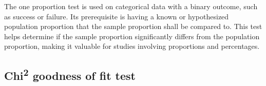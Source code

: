 \documentclass[
  a4paper,
]{scrbook}
\begin{document}
The one proportion test is used on categorical data with a binary
outcome, such as success or failure. Its prerequisite is having a known
or hypothesized population proportion that the sample proportion shall
be compared to. This test helps determine if the sample proportion
significantly differs from the population proportion, making it valuable
for studies involving proportions and percentages.

\begin{table}

\caption{\label{tbl-prop-test-res}The test results for the proportion
test.}


\end{table}%

\subsection{\texorpdfstring{Chi\textsuperscript{2} goodness of fit
test}{Chi2 goodness of fit test}}\label{chi2-goodness-of-fit-test}

\begin{table}

\caption{\label{tbl-chi-gof-data}The raw data for the gof \(\chi^2\)
test.}


\end{table}%
\end{document}
